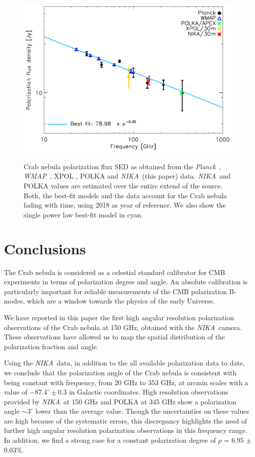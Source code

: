 \documentclass[twocolumn,traditabstract]{aa}
\def\NIKA{\textit{NIKA}}
\def\Planck{\textit{Planck}}
\def\WMAP{\textit{WMAP}}
\begin{document}
\begin{figure}
  \centering
             { \includegraphics[width=1\linewidth,keepaspectratio]{figures/Crab_SED_ipol_test.pdf}}
           \caption{Crab nebula polarization flux SED as obtained from the \Planck\ \citep{2015arXiv150702058P}, \WMAP\ \citep{2011ApJS..192...19W}, XPOL \citep{aumont2010}, POLKA \citep{2014PASP..126.1027W} and \NIKA\ (this paper) data. \NIKA\ and POLKA values are estimated over the entire extend of the source. Both, the best-fit models and the data account for the Crab nebula fading with time, using 2018 as year of reference. We also show the single power law best-fit model in cyan.}
\label{crab_SED_ipol}		
  \end{figure} 
 \noindent



\section{Conclusions}\label{sec:conclusions}
The Crab nebula is considered as a celestial standard calibrator for CMB experiments in
terms of polarization degree and angle. An absolute calibration is
particularly important for reliable measurements of the CMB polarization B-modes,
which are a window towards the physics of the early Universe.

We have reported in this paper the first high angular resolution polarization observations of the Crab nebula at 150 GHz, obtained with the \NIKA\ camera. These observations have
allowed us to map the spatial distribution of the polarization
fraction and angle.  

Using the \NIKA\ data, in addition to the all available polarization data to date, we conclude that the
polarization angle of the Crab nebula is consistent with being constant with
frequency, from 20 GHz to 353 GHz, at arcmin scales with a value of
$-87.4^{\circ}\pm0.3$ in Galactic coordinates. High resolution observations provided by \NIKA\ at 150 GHz and POLKA at 345 GHz show
a polarization angle $\sim 3^{\circ}$ lower than the average value. Though the uncertainties on these values are high because of the systematic errors, this discrepancy highlights the need of further high angular resolution polarization observations in this frequency range.
In addition, we find a strong case for a constant polarization degree of $p$ = 6.95 $\pm$ 0.03\%. 
\end{document}
